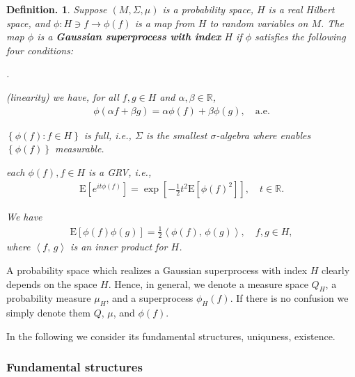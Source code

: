 \documentclass[openany, a4paper, oneside]{book}
\newcounter{enum2}
\renewenvironment{enumerate}{%
\begin{list}%
{%
\arabic{enum2}.\ \,%
}%
{%
\usecounter{enum2}
\setlength{\itemindent}{0pt}%
\setlength{\leftmargin}{6pt}%
\setlength{\rightmargin}{0pt}%
\setlength{\labelsep}{0pt}%
\setlength{\labelwidth}{6pt}%
\setlength{\itemsep}{0pt}%
\setlength{\parsep}{0pt}%
\setlength{\listparindent}{0pt}%
}
}{%
\end{list}%
}
\theoremstyle{break}
\theoremstyle{breakdefn}
\newtheorem{defn}[thm]{Definition.}
\newcommand{\sqbk}[1]{\left[#1\right]}
\newcommand{\cbk}[1]{\left\{#1\right\}}
\newcommand{\bkt}[2]{\left\langle#1,\,#2\right\rangle}
\newcommand{\set}[2]{\left\{#1 : #2\right\}}
\newcommand{\bbR}{\mathbb{R}}
\newcommand{\E}[1]{\rmE\sqbk{#1}}
\newcommand{\rmE}{\mathrm{E}}
\begin{document}
\begin{defn}
 Suppose $(M, \Sigma, \mu)$ is a probability space, $H$ is a real Hilbert space,
 and $\phi \colon H \ni f \to \phi (f)$ is a map from $H$ to random variables on $M$.
 The map $\phi$ is a \textbf{Gaussian superprocess with index} $H$ if $\phi$ satisfies
 the following four conditions:
\begin{enumerate}
\item (linearity) we have, for all $f, g \in H$ and $\alpha, \beta \in \bbR$,
  \begin{align}
   \phi (\alpha f + \beta g) = \alpha \phi (f) + \beta \phi (g), \quad \mathrm{a.e.}
  \end{align}
\item $\set{\phi (f)}{f \in H}$ is full, i.e., $\Sigma$ is the smallest $\sigma$-algebra where enables $\cbk{\phi (f)}$ measurable.
\item each $\phi (f), f \in H$ is a GRV, i.e.,
  \begin{align}
   \E{e^{it \phi (f)}} = \exp \sqbk{- \frac{1}{2} t^2 \E{\phi (f)^2}}, \quad t \in \bbR.
  \end{align}
\item We have
  \begin{align}
   \E{\phi (f) \phi (g)} = \frac{1}{2} \bkt{\phi (f)}{\phi (g)}, \quad f, g \in H,
  \end{align}
  where $\bkt{f}{g}$ is an inner product for $H$.
\end{enumerate}
\end{defn}
A probability space which realizes a Gaussian superprocess with index $H$ clearly depends on the space $H$.
Hence, in general, we denote a measure space $Q_{H}$, a probability measure $\mu_{H}$, and a superprocess $\phi_{H}(f)$.
If there is no confusion we simply denote them $Q$, $\mu$, and $\phi (f)$.

In the following we consider its fundamental structures, uniquness, existence.
\subsubsection{Fundamental structures}
\label{sec-8-2-2-2-1}
\end{document}
